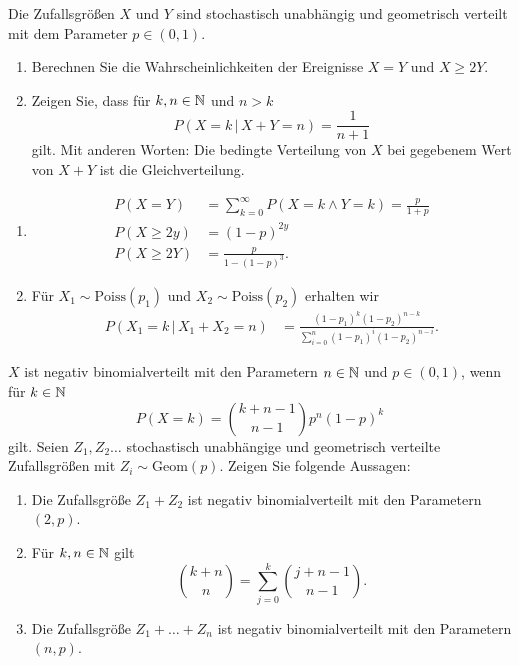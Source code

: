 Die Zufallsgrößen $X$ und $Y$ sind stochastisch unabhängig und geometrisch verteilt mit dem Parameter $p\in(0,1)$.
\begin{enumerate}
    \item Berechnen Sie die Wahrscheinlichkeiten der Ereignisse $X=Y$ und
        $X\geq 2Y$.

    \item Zeigen Sie, dass für $k,n\in\mathbb N$ und $n>k$
        \begin{equation*}
            P \left( X = k \,|\, X+Y = n \right) = \frac{1}{n+1}
        \end{equation*}
        gilt. Mit anderen Worten: Die bedingte Verteilung von $X$ bei gegebenem Wert von 
        $X+Y$ ist die Gleichverteilung.
\end{enumerate}

\solution
\begin{enumerate}
    \item \begin{align*}
            P\left( X = Y \right) &= \sum_{k=0}^{\infty} P\left( X=k \wedge Y=k \right) = \frac{p}{1+p} \\
            P\left( X \geq 2y \right) &= \left( 1-p \right)^{2y} \\
            P\left( X \geq 2Y \right) &= \frac{p}{1- (1-p)^{3}}.
        \end{align*}

    \item Für $X_1 \sim \text{Poiss}(p_1)$ und $X_2\sim\text{Poiss}(p_2)$ erhalten wir
        \begin{align*}
            P\left( X_1 = k \,|\, X_1+X_2 = n \right) &= 
            \frac{(1-p_1)^{k} (1-p_2)^{n-k}  }{ \sum_{i=0}^{n} (1-p_1)^i (1-p_2)^{n-i} }. 
        \end{align*}
\end{enumerate}


 $X$ ist negativ
binomialverteilt mit den Parametern $n\in\mathbb N$ und $p\in \left( 0,1 \right)$, wenn
für $k\in\mathbb N$
\begin{equation*}
    P(X = k) = \binom{k+n-1}{n-1} p^{n} (1-p)^{k} 
\end{equation*}
gilt. Seien $Z_1,Z_2\dots$ stochastisch unabhängige und geometrisch verteilte Zufallsgrößen mit 
$Z_i \sim \text{Geom}(p)$. Zeigen Sie folgende Aussagen: 
\begin{enumerate}
    \item Die Zufallsgröße $Z_1+Z_2$ ist negativ binomialverteilt mit den
        Parametern $(2,p)$. 
    \item Für $k, n \in\mathbb N$ gilt
        \begin{equation*}
            \binom{k+n}{n} = \sum_{j=0}^{k} \binom{j+n-1}{n-1}.
        \end{equation*}
    \item Die Zufallsgröße $Z_1+\dots+Z_n$ ist negativ binomialverteilt mit den
        Parametern $(n,p)$. 
\end{enumerate}

